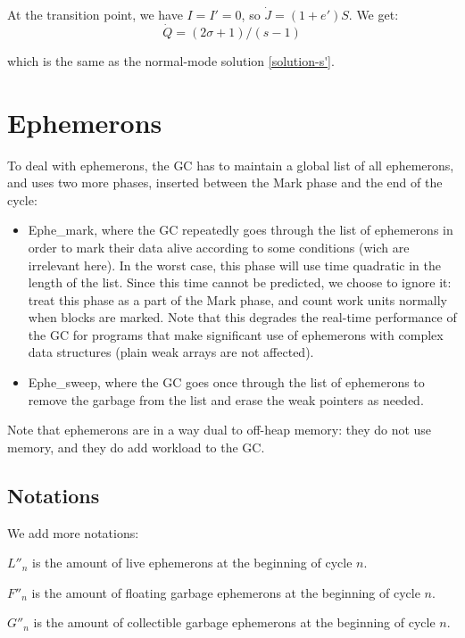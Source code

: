 \documentclass{article}
\begin{document}
At the transition point, we have $I = I' = 0$, so
$\dot{J} = (1+e')S$. We get:
\begin{equation}
\dot{Q} = (2\sigma+1) / (s-1)
\end{equation}

which is the same as the normal-mode solution \eqref{solution-s'}.

\section{Ephemerons}

To deal with ephemerons, the GC has to maintain a global list of all
ephemerons, and uses two more phases, inserted between
the Mark phase and the end of the cycle:
\begin{itemize}
\item Ephe\_mark, where the GC repeatedly goes through the list of
ephemerons in order to mark their data alive according to some
conditions (wich are irrelevant here). In the worst case, this phase
will use time quadratic in the length of the list. Since this time
cannot be predicted, we choose to ignore it: treat this phase as a
part of the Mark phase, and count work units normally when blocks are
marked. Note that this degrades the real-time performance of the GC
for programs that make significant use of ephemerons with complex data
structures (plain weak arrays are not affected).
\item Ephe\_sweep, where the GC goes once through the list of
ephemerons to remove the garbage from the list and erase the weak
pointers as needed.
\end{itemize}

Note that ephemerons are in a way dual to off-heap memory: they do not
use memory, and they do add workload to the GC.

\subsection{Notations}

We add more notations:

\bigskip
$L''_n$ is the amount of live ephemerons at the beginning of cycle $n$.

$F''_n$ is the amount of floating garbage ephemerons at the beginning
of cycle $n$.

$G''_n$ is the amount of collectible garbage ephemerons at the
beginning of cycle $n$.
\end{document}
